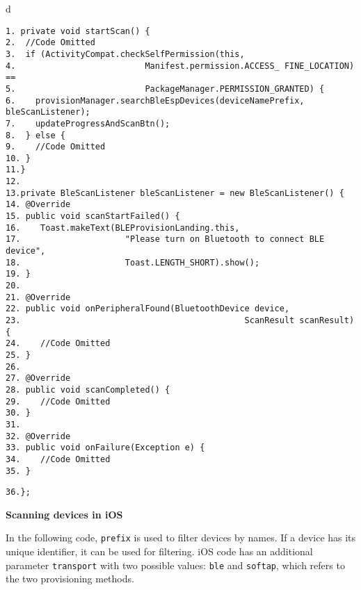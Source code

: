 \documentclass[a4paper,12pt]{book}
\begin{document}

\vspace{6pt}
\begin{codebloc}
\begin{tabular}{d}
\vspace{2pt}
\begin{verbatim}
1. private void startScan() {
2.  //Code Omitted
3.  if (ActivityCompat.checkSelfPermission(this,
4.                          Manifest.permission.ACCESS_ FINE_LOCATION) ==
5.                          PackageManager.PERMISSION_GRANTED) {
6.    provisionManager.searchBleEspDevices(deviceNamePrefix, bleScanListener);
7.    updateProgressAndScanBtn();
8.  } else {
9.    //Code Omitted
10. }
11.}
12.
13.private BleScanListener bleScanListener = new BleScanListener() {
14. @Override
15. public void scanStartFailed() {
16.    Toast.makeText(BLEProvisionLanding.this,
17.                     "Please turn on Bluetooth to connect BLE device",
18.                     Toast.LENGTH_SHORT).show();
19. }
20.
21. @Override
22. public void onPeripheralFound(BluetoothDevice device,
23.                                             ScanResult scanResult) {
24.    //Code Omitted
25. }
26.
27. @Override
28. public void scanCompleted() {
29.    //Code Omitted
30. }
31.
32. @Override
33. public void onFailure(Exception e) {
34.    //Code Omitted
35. }
\end{verbatim}
\verb|36.};|
\end{tabular}
\end{codebloc}

\textbf{Scanning devices in iOS}

In the following code, \verb|prefix| is used to filter devices by names. If a device has its unique identifier, it can be used for filtering. iOS code has an additional parameter \verb|transport| with two possible values: \verb|ble| and \verb|softap|, which refers to the two provisioning methods.

\end{document}
